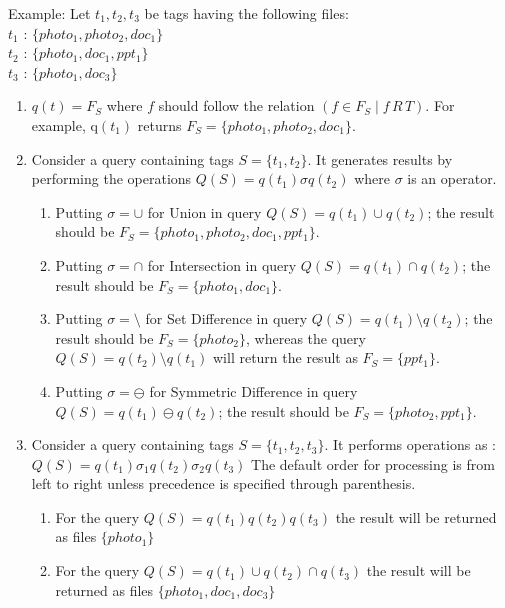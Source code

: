 Example:
\noindent Let $t_{1}, t_{2}, t_{3}$ be tags having the following files: \\
\indent $t_{1}$ : $\{photo_{1},photo_{2},doc_{1}\}$  \\
\indent $t_{2}$ : $\{photo_{1},doc_{1}, ppt_{1}\}$  \\
\indent $t_{3}$ : $\{photo_{1},doc_{3}\}$ 
\begin{enumerate}
\item $q(t) = F_{S}$ where $f$ should follow the relation $(f \in F_S \mid f \, R \, T)$. 
For example, q$(t_{1})$ returns $F_S = \{photo_{1},photo_{2},doc_{1}\}$.
\item Consider a query containing tags $S = \{t_{1}, t_{2}\}$. 
It generates results by performing the operations $Q(S) = q(t_{1})\sigma q(t_{2})$
where $\sigma $ is an operator.
\begin{enumerate}
\item Putting $\sigma = \cup$ for Union in query $Q(S) = q(t_{1})\cup q(t_{2})$; the result should be $F_S = \{photo_1, photo_2, doc_1, ppt_1\}$. 	
\item Putting $\sigma = \cap$ for Intersection in query $Q(S) = q(t_{1})\cap q(t_{2})$; the result should be $F_S = \{photo_1, doc_1\}$.
\item Putting $\sigma = \setminus$ for Set Difference in query $Q(S) = q(t_{1})\setminus q(t_{2})$; the result should be $F_S = \{photo_2\}$, whereas the query $Q(S) = q(t_{2}) \setminus q(t_{1})$ will return the result as $F_S = \{ppt_1\}$.
\item Putting $\sigma = \ominus$ for Symmetric Difference in query $Q(S) = q(t_{1})\ominus q(t_{2})$; the result should be $F_S = \{photo_2, ppt_1\}$.
\end{enumerate}

\item Consider a query containing tags $S = \{t_{1}, t_{2}, t_{3}\}$.
It performs operations as : $Q(S) = q(t_{1})\sigma_{1} q(t_{2})\sigma_{2} q(t_{3})$
The default order for processing is from left to right unless precedence is specified through parenthesis.

\begin{enumerate}
\item For the query $Q(S) = q(t_{1}) q(t_{2}) q(t_{3})$ the result will be returned as files $\{photo_{1}\}$
\item For the query $Q(S) = q(t_{1}) \cup q(t_{2}) \cap q(t_{3})$ the result will be returned as files $\{photo_{1}, doc_{1}, doc_{3}\}$
\end{enumerate}
\end{enumerate}

